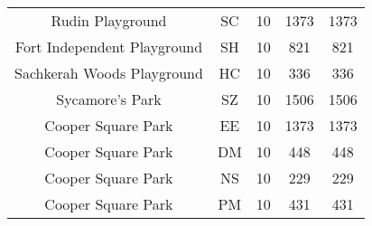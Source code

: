 \begin{center}
\begin{tabular}{|ccccc|}
    Rudin Playground            & SC                & 10                & 1373                       & 1373                               \\
    Fort Independent Playground & SH                & 10                & 821                        & 821                                \\
    Sachkerah Woods Playground  & HC                & 10                & 336                        & 336                                \\
    Sycamore's Park             & SZ                & 10                & 1506                       & 1506                               \\
    Cooper Square Park          & EE                & 10                & 1373                       & 1373                               \\
    Cooper Square Park          & DM                & 10                & 448                        & 448                                \\
    Cooper Square Park          & NS                & 10                & 229                        & 229                                \\
    Cooper Square Park          & PM                & 10                & 431                        & 431 \\\hline                              
    \end{tabular}
\end{center}

